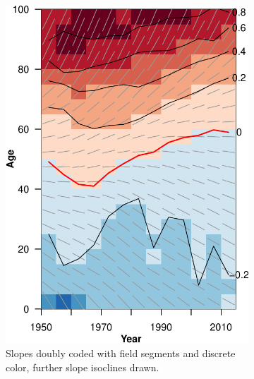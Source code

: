 \documentclass{article}
\begin{document}
\begin{figure}
\begin{subfigure}{.5\textwidth}
  \centering
  \includegraphics[scale=.6]{Figures/Fig11-crop.pdf}
  \caption{Slopes doubly coded with field segments and discrete color, further
  slope isoclines drawn.}
  \label{fig:sfig3}
\end{subfigure}%
\begin{subfigure}{.5\textwidth}
  \centering

\end{subfigure}
\end{figure}
\end{document}

